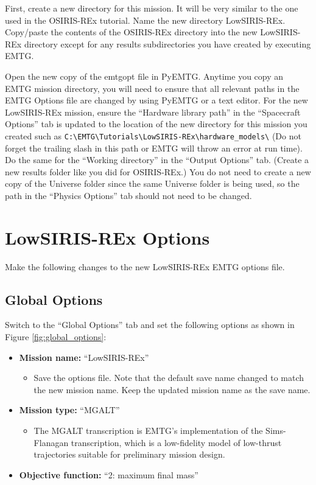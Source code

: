 \documentclass[11pt]{article}
\begin{document}
\noindent First, create a new directory for this mission. It will be very similar to the one used in the OSIRIS-REx tutorial. Name the new directory LowSIRIS-REx. Copy/paste the contents of the OSIRIS-REx directory into the new LowSIRIS-REx directory except for any results subdirectories you have created by executing \ac{EMTG}.

\noindent Open the new copy of the emtgopt file in PyEMTG. Anytime you copy an \ac{EMTG} mission directory, you will need to ensure that all relevant paths in the \ac{EMTG} Options file are changed by using PyEMTG or a text editor. For the new LowSIRIS-REx mission, ensure the ``Hardware library path'' in the ``Spacecraft Options'' tab is updated to the location of the new directory for this mission you created such as \texttt{C:\textbackslash EMTG\textbackslash Tutorials\textbackslash LowSIRIS-REx\textbackslash hardware\_models\textbackslash} (Do not forget the trailing slash in this path or \ac{EMTG} will throw an error at run time). Do the same for the ``Working directory'' in the ``Output Options'' tab. (Create a new results folder like you did for OSIRIS-REx.) You do not need to create a new copy of the Universe folder since the same Universe folder is being used, so the path in the “Physics Options” tab should not need to be changed.

\section{LowSIRIS-REx Options}
\label{sec:lowsiris-rex_options}

Make the following changes to the new LowSIRIS-REx \ac{EMTG} options file.

\subsection{Global Options}
\label{sec:global_options}

Switch to the ``Global Options'' tab and set the following options as shown in Figure \ref{fig:global_options}:

\begin{itemize}
	\item \textbf{Mission name:} ``LowSIRIS-REx''
	\begin{itemize}
		\item Save the options file. Note that the default save name changed to match the new mission name. Keep the updated mission name as the save name.
	\end{itemize}
	\item \textbf{Mission type:} ``\ac{MGALT}''
	\begin{itemize}
		\item The \ac{MGALT} transcription is \ac{EMTG}'s implementation of the Sims-Flanagan transcription, which is a low-fidelity model of low-thrust trajectories suitable for preliminary mission design.
	\end{itemize}
	\item \textbf{Objective function:} ``2: maximum final mass''
\end{itemize}
\end{document}
